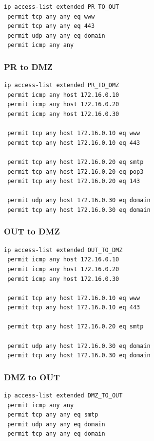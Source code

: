 \documentclass[12pt]{article}
\begin{document}
\begin{lstlisting}
ip access-list extended PR_TO_OUT
 permit tcp any any eq www
 permit tcp any any eq 443
 permit udp any any eq domain
 permit icmp any any
\end{lstlisting}

\subsubsection{PR to DMZ}

\begin{lstlisting}
ip access-list extended PR_TO_DMZ
 permit icmp any host 172.16.0.10
 permit icmp any host 172.16.0.20
 permit icmp any host 172.16.0.30

 permit tcp any host 172.16.0.10 eq www
 permit tcp any host 172.16.0.10 eq 443

 permit tcp any host 172.16.0.20 eq smtp
 permit tcp any host 172.16.0.20 eq pop3
 permit tcp any host 172.16.0.20 eq 143

 permit udp any host 172.16.0.30 eq domain
 permit tcp any host 172.16.0.30 eq domain
\end{lstlisting}

\subsubsection{OUT to DMZ}

\begin{lstlisting}
ip access-list extended OUT_TO_DMZ
 permit icmp any host 172.16.0.10
 permit icmp any host 172.16.0.20
 permit icmp any host 172.16.0.30

 permit tcp any host 172.16.0.10 eq www
 permit tcp any host 172.16.0.10 eq 443

 permit tcp any host 172.16.0.20 eq smtp

 permit udp any host 172.16.0.30 eq domain
 permit tcp any host 172.16.0.30 eq domain
\end{lstlisting}

\subsubsection{DMZ to OUT}

\begin{lstlisting}
ip access-list extended DMZ_TO_OUT
 permit icmp any any
 permit tcp any any eq smtp
 permit udp any any eq domain
 permit tcp any any eq domain
\end{lstlisting}
\end{document}
